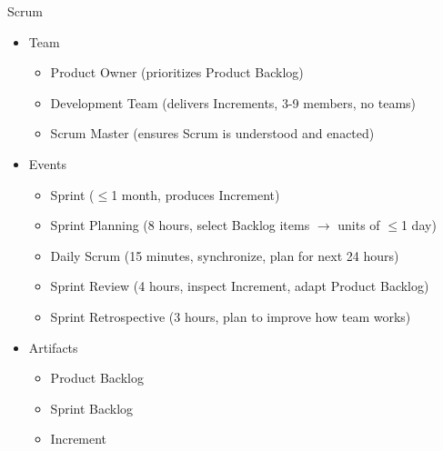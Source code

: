 \documentclass{beamer}
\begin{document}
\begin{frame}{Scrum}
\begin{itemize}
\item Team
\begin{itemize}
\item Product Owner (prioritizes Product Backlog)
\item Development Team (delivers Increments, 3-9 members, no teams)
\item Scrum Master (ensures Scrum is understood and enacted)
\end{itemize}
\item Events
\begin{itemize}
\item Sprint ($\leq$1 month, produces Increment)
\item Sprint Planning (8 hours, select Backlog items $\rightarrow$ units of $\leq$1 day)
\item Daily Scrum (15 minutes, synchronize, plan for next 24 hours)
\item Sprint Review (4 hours, inspect Increment, adapt Product Backlog)
\item Sprint Retrospective (3 hours, plan to improve how team works)
\end{itemize}
\item Artifacts
\begin{itemize}
\item Product Backlog
\item Sprint Backlog
\item Increment
\end{itemize}
\end{itemize}
\end{frame}
\end{document}
